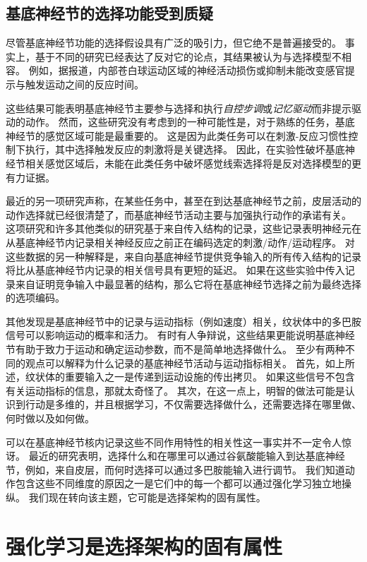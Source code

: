 \subsection{基底神经节的选择功能受到质疑}

尽管基底神经节功能的选择假设具有广泛的吸引力，但它绝不是普遍接受的。
事实上，基于不同的研究已经表达了反对它的论点，其结果被认为与选择模型不相容。
例如，据报道，内部苍白球运动区域的神经活动损伤或抑制未能改变感官提示与触发运动之间的反应时间。


这些结果可能表明基底神经节主要参与选择和执行\textit{自控步调}或\textit{记忆驱动}而非提示驱动的动作。
然而，这些研究没有考虑到的一种可能性是，对于熟练的任务，基底神经节的感觉区域可能是最重要的。
这是因为此类任务可以在刺激-反应习惯性控制下执行，其中选择触发反应的刺激将是关键选择。
因此，在实验性破坏基底神经节相关感觉区域后，未能在此类任务中破坏感觉线索选择将是反对选择模型的更有力证据。


最近的另一项研究声称，在某些任务中，甚至在到达基底神经节之前，皮层活动的动作选择就已经很清楚了，而基底神经节活动主要与加强执行动作的承诺有关。
这项研究和许多其他类似的研究基于来自传入结构的记录，这些记录表明神经元在从基底神经节内记录相关神经反应之前正在编码选定的刺激/动作/运动程序。
对这些数据的另一种解释是，来自向基底神经节提供竞争输入的所有传入结构的记录将比从基底神经节内记录的相关信号具有更短的延迟。
如果在这些实验中传入记录来自证明竞争输入中最显著的结构，那么它将在基底神经节选择之前为最终选择的选项编码。


其他发现是基底神经节中的记录与运动指标（例如速度）相关，纹状体中的多巴胺信号可以影响运动的概率和活力。
有时有人争辩说，这些结果更能说明基底神经节有助于致力于运动和确定运动参数，而不是简单地选择做什么。
至少有两种不同的观点可以解释为什么记录的基底神经节活动与运动指标相关。
首先，如上所述，纹状体的重要输入之一是传递到运动设施的传出拷贝。
如果这些信号不包含有关运动指标的信息，那就太奇怪了。
其次，在这一点上，明智的做法可能是认识到行动是多维的，并且根据学习，不仅需要选择做什么，还需要选择在哪里做、何时做以及如何做。


可以在基底神经节核内记录这些不同作用特性的相关性这一事实并不一定令人惊讶。
最近的研究表明，选择什么和在哪里可以通过谷氨酸能输入到达基底神经节，例如，来自皮层，而何时选择可以通过多巴胺能输入进行调节。
我们知道动作包含这些不同维度的原因之一是它们中的每一个都可以通过强化学习独立地操纵。
我们现在转向该主题，它可能是选择架构的固有属性。



\section{强化学习是选择架构的固有属性}

